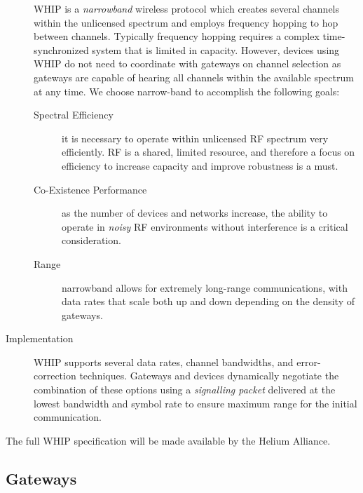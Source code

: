 \documentclass[10pt, nonatbib, nocopyrightspace, reprint]{sigplanconf}
\begin{document}
\begin{description}
        WHIP is a \emph{narrowband} wireless protocol which creates several channels within the unlicensed spectrum and employs frequency hopping to hop between channels. Typically frequency hopping requires a complex time-synchronized system that is limited in capacity. However, devices using WHIP do not need to coordinate with gateways on channel selection as gateways are capable of hearing all channels within the available spectrum at any time. We choose narrow-band to accomplish the following goals:

        \begin{description}
                \item[Spectral Efficiency] it is necessary to operate within unlicensed RF spectrum very efficiently. RF is a shared, limited resource, and therefore a focus on efficiency to increase capacity and improve robustness is a must.
                \item[Co-Existence Performance] as the number of devices and networks increase, the ability to operate in \emph{noisy} RF environments without interference is a critical consideration.
                \item[Range] narrowband allows for extremely long-range communications, with data rates that scale both up and down depending on the density of gateways.
        \end{description}

        \item [Implementation] WHIP supports several data rates, channel bandwidths, and error-correction techniques. Gateways and devices dynamically negotiate the combination of these options using a \emph{signalling packet} delivered at the lowest bandwidth and symbol rate to ensure maximum range for the initial communication.
\end{description}

The full WHIP specification will be made available by the Helium Alliance.

\subsection{Gateways}\label{gateways}
\end{document}
